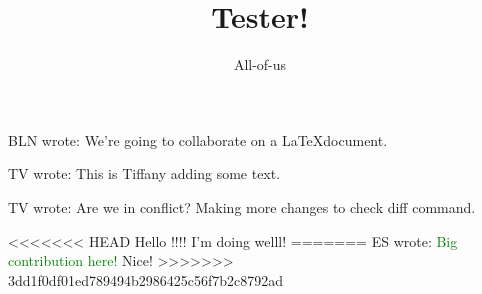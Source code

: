 \documentclass[12pt]{article}
\title{Tester!}
\author{All-of-us}
\newcommand{\bln}[1]{BLN wrote: \textcolor{red!70!blue!70}{#1}}
\newcommand{\tv}[1]{TV wrote: \textcolor{blue!70}{#1}}
\newcommand{\es}[1]{ES wrote: \textcolor{green}{#1}}
\begin{document}
\maketitle

\bln{We're going to collaborate on a \LaTeX document.}

\tv{This is Tiffany adding some text.}

\tv{Are we in conflict? Making more changes to check diff command.}

<<<<<<< HEAD
Hello !!!! I'm doing welll!
=======
\es{Big contribution here!}
Nice!
>>>>>>> 3dd1f0df01ed789494b2986425c56f7b2c8792ad
\end{document}
